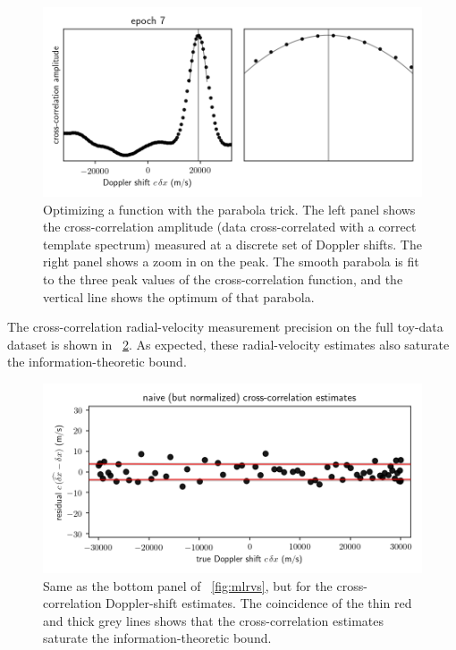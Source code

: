 \documentclass[modern]{aastex631}
\newcommand{\figref}[1]{\figurename~\ref{#1}}
\begin{document}
\begin{figure}[tp]
  \begin{mdframed}
    \begin{center}
    \includegraphics[width=\textwidth]{../notebook/ccf.png}
    \end{center}
    \caption{Optimizing a function with the parabola trick. The left panel shows the cross-correlation amplitude (data cross-correlated with a correct template spectrum) measured at a discrete set of Doppler shifts. The right panel shows a zoom in on the peak. The smooth parabola is fit to the three peak values of the cross-correlation function, and the vertical line shows the optimum of that parabola.\label{fig:ccf}}
  \end{mdframed}
\end{figure}

The cross-correlation radial-velocity measurement precision on the full toy-data dataset is shown in \figref{fig:ccfrvs}.
As expected, these radial-velocity estimates also saturate the information-theoretic bound.

\begin{figure}[tp]
  \begin{mdframed}
    \begin{center}
    \includegraphics[width=\textwidth]{../notebook/ccfrvs.png}
    \end{center}
    \caption{Same as the bottom panel of \figref{fig:mlrvs}, but for the cross-correlation Doppler-shift estimates. The coincidence of the thin red and thick grey lines shows that the cross-correlation estimates saturate the information-theoretic bound.\label{fig:ccfrvs}}
  \end{mdframed}
\end{figure}
\end{document}
